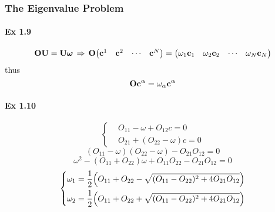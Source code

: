 \documentclass[a4paper]{article}
\DeclareMathOperator{\dra}{\Rightarrow}
\newcommand{\ex}[1]{\paragraph{Ex #1}}
\numberwithin{equation}{subsection}
\begin{document}
\subsubsection{The Eigenvalue Problem}
\ex{1.9}
\begin{equation}\label{key}
\vb{O}\vb{U} = \vb{U}\bm\omega \;\dra\; \vb{O}\mqty(\vb{c}^1 & \vb{c}^2 & \cdots & \vb{c}^N) = \mqty(\omega_1\vb{c}_1 & \omega_2\vb{c}_2 & \cdots & \omega_N\vb{c}_N)
\end{equation}
thus
\begin{equation}\label{key}
\vb{O}\vb{c}^\alpha = \omega_\alpha \vb{c}^\alpha
\end{equation}
\ex{1.10}
\begin{equation}\label{key}
\left\{
\begin{aligned}
&O_{11}-\omega + O_{12}c = 0\\
&O_{21} + (O_{22}-\omega)c = 0
\end{aligned}\right.
\end{equation}
\begin{equation}\label{key}
(O_{11}-\omega)(O_{22}-\omega) - O_{21}O_{12} = 0
\end{equation}
\begin{equation}\label{key}
\omega^2 - (O_{11}+O_{22})\omega + O_{11}O_{22} - O_{21}O_{12} = 0
\end{equation}
\begin{equation}\label{key}
\left\{\begin{aligned}
&\omega_1 = \dfrac{1}{2}\qty(O_{11}+O_{22} - \sqrt{(O_{11}-O_{22})^2 + 4O_{21}O_{12}})\\
&\omega_2 = \dfrac{1}{2}\qty(O_{11}+O_{22} + \sqrt{(O_{11}-O_{22})^2 + 4O_{21}O_{12}})
\end{aligned}\right.
\end{equation}
\end{document}
